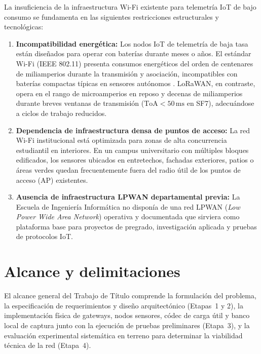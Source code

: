\documentclass[12pt,oneside,openany,spanish,oldfontcommands]{memoir}
\begin{document}
La insuficiencia de la infraestructura Wi-Fi existente para telemetría IoT de bajo consumo se
fundamenta en las siguientes restricciones estructurales y tecnológicas:

\begin{enumerate}
    \item \textbf{Incompatibilidad energética:} Los nodos IoT de telemetría de baja tasa
    están diseñados para operar con baterías durante meses o años. El estándar Wi-Fi
    (IEEE 802.11) presenta consumos energéticos del orden de centenares de miliamperios
    durante la transmisión y asociación, incompatibles con baterías compactas típicas en
    sensores autónomos \parencite{callebaut2020}. LoRaWAN, en contraste, opera en el rango
    de microamperios en reposo y decenas de miliamperios durante breves ventanas de transmisión
    ($\text{ToA} < 50\,\text{ms}$ en SF7), adecuándose a ciclos de trabajo reducidos.

    \item \textbf{Dependencia de infraestructura densa de puntos de acceso:} La red Wi-Fi
    institucional está optimizada para zonas de alta concurrencia estudiantil en interiores.
    En un campus universitario con múltiples bloques edificados, los sensores ubicados en
    entretechos, fachadas exteriores, patios o áreas verdes quedan frecuentemente fuera del
    radio útil de los puntos de acceso (AP) existentes.

    \item \textbf{Ausencia de infraestructura LPWAN departamental previa:} La Escuela de
    Ingeniería Informática no disponía de una red LPWAN (\textit{Low Power Wide Area Network})
    operativa y documentada que sirviera como plataforma base para proyectos de pregrado,
    investigación aplicada y pruebas de protocolos IoT.
\end{enumerate}

\section{Alcance y delimitaciones}

El alcance general del Trabajo de Título comprende la formulación del problema, la especificación
de requerimientos y diseño arquitectónico (Etapas~1 y 2), la implementación física de gateways,
nodos sensores, códec de carga útil y banco local de captura junto con la ejecución de pruebas
preliminares (Etapa~3), y la evaluación experimental sistemática en terreno para determinar la
viabilidad técnica de la red (Etapa~4).
\end{document}
